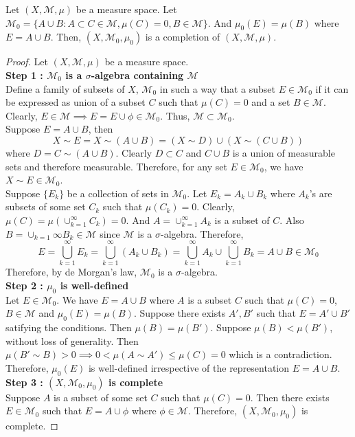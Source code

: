 \begin{theorem}[completion]
	Let $(X,\mathcal{M},\mu)$ be a measure space.
	Let $\mathcal{M}_0 = \{ A \cup B : A \subset C \in \mathcal{M}, \mu(C) = 0, B \in \mathcal{M} \}$.
	And $\mu_0(E) = \mu(B)$ where $E = A \cup B$.
	Then, $(X,\mathcal{M}_0,\mu_0)$ is a completion of $(X,\mathcal{M},\mu)$.
\end{theorem}
\begin{proof}
	Let $(X,\mathcal{M},\mu)$ be a measure space.\\

	\textbf{Step 1 : $\mathcal{M}_0$ is a $\sigma$-algebra containing $\mathcal{M}$}\\
	Define a family of subsets of $X$, $\mathcal{M}_0$ in such a way that a subset $E \in \mathcal{M}_0$ if it can be expressed as union of a subset $C$ such that $\mu(C) = 0$ and a set $B \in \mathcal{M}$.
	Clearly, $E \in \mathcal{M} \implies E = E \cup \phi \in \mathcal{M}_0$.
	Thus, $\mathcal{M} \subset \mathcal{M}_0$.\\

	Suppose $E = A \cup B$, then $$X \sim E = X \sim (A \cup B) = (X \sim D) \cup (X \sim (C \cup B))$$ where $D = C \sim (A \cup B)$.
	Clearly $D \subset C$ and $C \cup B$ is a union of measurable sets and therefore measurable.
	Therefore, for any set $E \in \mathcal{M}_0$, we have $X \sim E \in \mathcal{M}_0$.\\

	Suppose $\{ E_k \}$ be a collection of sets in $\mathcal{M}_0$.
	Let $E_k = A_k \cup B_k$ where $A_k$'s are subsets of some set $C_k$ such that $\mu(C_k) = 0$.
	Clearly,$\mu(C) = \mu(\cup_{k=1}^\infty C_k) = 0$.
	And $A = \cup_{k=1}^\infty A_k$ is a subset of $C$.
	Also $B = \cup_{k=1}\infty B_k \in \mathcal{M}$ since $\mathcal{M}$ is a $\sigma$-algebra.
	Therefore,
	$$ E = \bigcup_{k=1}^\infty E_k = \bigcup_{k=1}^\infty (A_k \cup B_k) = \bigcup_{k=1}^\infty A_k \cup \bigcup_{k=1}^\infty B_k = A \cup B \in \mathcal{M}_0$$
	Therefore, by de Morgan's law, $\mathcal{M}_0$ is a $\sigma$-algebra.\\

	\textbf{Step 2 : $\mu_0$ is well-defined}\\
		Let $E \in \mathcal{M}_0$.
		We have $E = A \cup B$ where $A$ is a subset $C$ such that $\mu(C) = 0$, $B \in \mathcal{M}$ and $\mu_0(E) = \mu(B)$.
		Suppose there exists $A',B'$ such that $E = A' \cup B'$ satifying the conditions.
		Then $\mu(B) = \mu(B')$.
		Suppose $\mu(B) < \mu(B')$, without loss of generality.
		Then $\mu(B' \sim B) > 0 \implies 0 < \mu(A \sim A') \le \mu(C) = 0$ which is a contradiction.
		Therefore, $\mu_0(E)$ is well-defined irrespective of the representation $E = A \cup B$.\\

	\textbf{Step 3 : $(X,\mathcal{M}_0,\mu_0)$ is complete}\\
	Suppose $A$ is a subset of some set $C$ such that $\mu(C) = 0$.
	Then there exists $E \in \mathcal{M}_0$ such that $E = A \cup \phi$ where $\phi \in \mathcal{M}$.
	Therefore, $(X,\mathcal{M}_0,\mu_0)$ is complete.
\end{proof}

